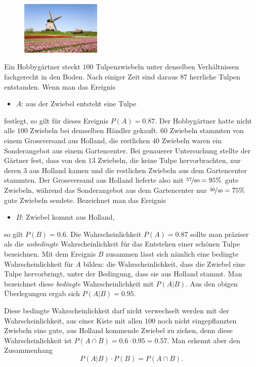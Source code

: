 \documentclass[%
<<<<<<< Updated upstream
11pt,%
twoside,%
titlepage,%
german,%
=======
11pt,%
twoside,%
titlepage,%
swissgerman,%
>>>>>>> Stashed changes
headsepline%
]{scrartcl}
\theoremstyle{definition}
\theoremstyle{plain}
\begin{document}
\begin{figure}
  \begin{center}
    \includegraphics[width=0.34\textwidth]{pictures/tulpen}
  \end{center}
\end{figure}
Ein Hobbygärtner steckt $100$ Tulpenzwiebeln unter denselben Verhältnissen fachgerecht in den Boden. Nach einiger Zeit sind daraus $87$ herrliche Tulpen entstanden. Wenn man das Ereignis
\begin{itemize}
    \item[] $A$: aus der Zwiebel entsteht eine Tulpe
\end{itemize}
festlegt, so gilt für dieses Ereignis $P(A)=0.87$.
Der Hobbygärtner hatte nicht alle $100$ Zwiebeln bei demselben Händler gekauft. $60$ Zwiebeln stammten von einem Grossversand aus Holland, die restlichen $40$ Zwiebeln waren ein Sonderangebot aus einem Gartencenter. Bei genauerer Untersuchung stellte der Gärtner fest, dass von den $13$ Zwiebeln, die keine Tulpe hervorbrachten, nur deren $3$ aus Holland kamen und die restlichen Zwiebeln aus dem Gartencenter stammten. Der Grossversand aus Holland lieferte also mit $\nicefrac{57}{60}=95\%$ gute Zwiebeln, während das Sonderangebot aus dem Gartencenter nur $\nicefrac{30}{40}=75\%$ gute Zwiebeln sendete. Bezeichnet man das Ereignis
\begin{itemize}
    \item[] $B$: Zwiebel kommt aus Holland,
\end{itemize}
so gilt $P(B)=0.6$.
Die Wahrscheinlichkeit $P(A)=0.87$ sollte man präziser als die \emph{unbedingte} Wahrscheinlichkeit für das Entstehen einer schönen Tulpe bezeichnen. Mit dem Ereignis $B$ zusammen lässt sich nämlich eine bedingte Wahrscheinlichkeit für $A$ bilden: die Wahrscheinlichkeit, dass die Zwiebel eine Tulpe hervorbringt, unter der Bedingung, dass sie aus Holland stammt. Man bezeichnet diese \emph{bedingte} Wahrscheinlichkeit mit $P(A|B)$.
Aus den obigen Überlegungen ergab sich $P(A|B)=0.95$.

Diese bedingte Wahrscheinlichkeit darf nicht verwechselt werden mit der Wahrscheinlichkeit, aus einer Kiste mit allen $100$ noch nicht eingepflanzten Zwiebeln eine gute, aus Holland kommende Zwiebel zu ziehen, denn diese Wahrscheinlichkeit ist $P(A\cap B)=0.6\cdot0.95 = 0.57$.
Man erkennt aber den Zusammenhang
$$P(A|B)\cdot P(B)=P(A\cap B).$$
\end{document}
